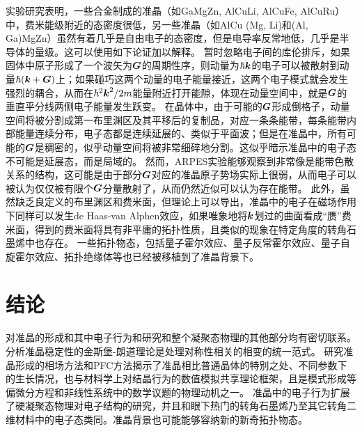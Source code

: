 \documentclass[hyperref, UTF8, a4paper]{ctexart}
\begin{document}
实验研究表明，一些合金制成的准晶（如GaMgZn, AlCuLi, AlCuFe, AlCuRu）中，费米能级附近的态密度很低，另一些准晶（如AlCu (Mg, Li)和(Al, Ga)MgZn）虽然有着几乎是自由电子的态密度，但是电导率反常地低，几乎是半导体的量级\cite{quasi-experimental}。这可以使用如下论证加以解释。
暂时忽略电子间的库伦排斥，如果固体中原子形成了一个波矢为$\vb*{G}$的周期性序，则动量为$\hbar\vb*{k}$的电子可以被散射到动量$\hbar (\vb*{k} + \vb*{G})$上；如果碰巧这两个动量的电子能量接近，这两个电子模式就会发生强烈的耦合，从而在$\hbar^2 \vb*{k}^2 / 2m$能量附近打开能隙，体现在动量空间中，就是$\vb*{G}$的垂直平分线两侧电子能量发生跃变。
在晶体中，由于可能的$\vb*{G}$形成倒格子，动量空间将被分割成第一布里渊区及其平移后的复制品，对应一条条能带，每条能带内部能量连续分布，电子态都是连续延展的、类似于平面波；但是在准晶中，所有可能的$\vb*{G}$是稠密的，似乎动量空间将被非常细碎地分割。这似乎暗示准晶中的电子态不可能是延展态，而是局域的。
然而，ARPES实验能够观察到非常像是能带色散关系的结构，这可能是由于部分$\vb*{G}$对应的准晶原子势场实际上很弱，从而电子可以被认为仅仅被有限个$\vb*{G}$分量散射了，从而仍然近似可以认为存在能带\cite{ROTENBERG2004237}。
此外，虽然缺乏良定义的布里渊区和费米面，但理论上可以导出，准晶中的电子在磁场作用下同样可以发生de Haas-van Alphen效应，如果唯象地将$\vb*{k}$划过的曲面看成“赝”费米面，得到的费米面将具有非平庸的拓扑性质，且类似的现象在特定角度的转角石墨烯中也存在\cite{PhysRevB.100.081405}。
一些拓扑物态，包括量子霍尔效应、量子反常霍尔效应、量子自旋霍尔效应、拓扑绝缘体等也已经被移植到了准晶背景下\cite{topo2021}。

\section{结论}

对准晶的形成和其中电子行为和研究和整个凝聚态物理的其他部分均有密切联系。分析准晶稳定性的金斯堡-朗道理论是处理对称性相关的相变的统一范式。
研究准晶形成的相场方法和PFC方法揭示了准晶相比普通晶体的特别之处、不同参数下的生长情况，也与材料学上对结晶行为的数值模拟共享理论框架，且是模式形成等偏微分方程和非线性系统中的数学议题的物理动机之一。
准晶中的电子行为扩展了硬凝聚态物理对电子结构的研究，并且和眼下热门的转角石墨烯乃至其它转角二维材料中的电子态类同。准晶背景也可能能够容纳新的新奇拓扑物态。


 
\end{document}
